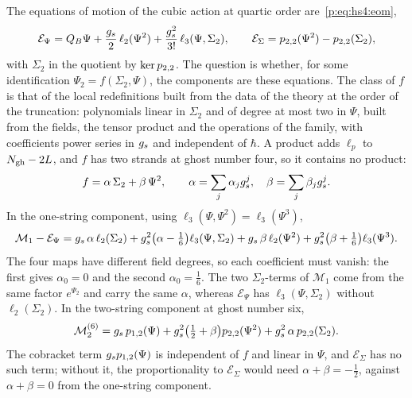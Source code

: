 The equations of motion of the cubic action at quartic order are~\eqref{p:eq:hs4:eom},
\begin{equation}
  \mathcal{E}_\Psi
    = Q_B \Psi + \frac{g_s}{2} \, \ell_2(\Psi^2) + \frac{g_s^2}{3!} \, \ell_3(\Psi, \Sigma_2),
  \qquad
  \mathcal{E}_\Sigma
    = p_{2,2}(\Psi^2) - p_{2,2}(\Sigma_2),
\end{equation}
with $\Sigma_2$ in the quotient by $\ker p_{2,2}$.
The question is whether, for some identification $\Psi_2 = f(\Sigma_2, \Psi)$, the components are these equations.
The class of $f$ is that of the local redefinitions built from the data of the theory at the order of the truncation: polynomials linear in $\Sigma_2$ and of degree at most two in $\Psi$, built from the fields, the tensor product and the operations of the family, with coefficients power series in $g_s$ and independent of $\hbar$.
A product adds $\ell_p$ to $N_{\text{gh}} - 2 L$, and $f$ has two strands at ghost number four, so it contains no product:
\begin{equation}
  f
    = \alpha \, \Sigma_2 + \beta \, \Psi^2,
  \qquad
  \alpha
    = \sum_j \alpha_j g_s^j,
  \quad
  \beta
    = \sum_j \beta_j g_s^j.
\end{equation}
In the one-string component, using $\ell_3(\Psi, \Psi^2) = \ell_3(\Psi^3)$,
\begin{equation}
  \mathcal{M}_1 - \mathcal{E}_\Psi
    = g_s \, \alpha \, \ell_2(\Sigma_2) + g_s^2 \bigl( \alpha - \tfrac{1}{6} \bigr) \ell_3(\Psi, \Sigma_2) + g_s \, \beta \, \ell_2(\Psi^2) + g_s^2 \bigl( \beta + \tfrac{1}{6} \bigr) \ell_3(\Psi^3).
\end{equation}
The four maps have different field degrees, so each coefficient must vanish: the first gives $\alpha_0 = 0$ and the second $\alpha_0 = \tfrac{1}{6}$.
The two $\Sigma_2$-terms of $\mathcal{M}_1$ come from the same factor $e^{\Psi_2}$ and carry the same $\alpha$, whereas $\mathcal{E}_\Psi$ has $\ell_3(\Psi, \Sigma_2)$ without $\ell_2(\Sigma_2)$.
In the two-string component at ghost number six,
\begin{equation}
  \mathcal{M}_2^{(6)}
    = g_s \, p_{1,2}(\Psi) + g_s^2 \bigl( \tfrac{1}{2} + \beta \bigr) p_{2,2}(\Psi^2) + g_s^2 \, \alpha \, p_{2,2}(\Sigma_2).
\end{equation}
The cobracket term $g_s p_{1,2}(\Psi)$ is independent of $f$ and linear in $\Psi$, and $\mathcal{E}_\Sigma$ has no such term; without it, the proportionality to $\mathcal{E}_\Sigma$ would need $\alpha + \beta = - \tfrac{1}{2}$, against $\alpha + \beta = 0$ from the one-string component.
